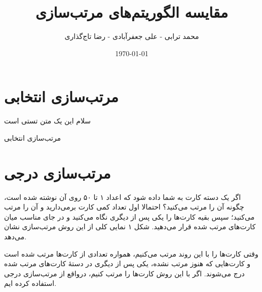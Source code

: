 \documentclass[12pt]{article}
\title{مقایسه الگوریتم‌های مرتب‌سازی}
\author{محمد ترابی - علی جعفر‌آبادی - رضا تاج‌گذاری}
\date{\today}
\makeatletter
\def\BState{\State\hskip-\ALG@thistlm}
\makeatother
\begin{document}
\maketitle

\section{مرتب‌سازی انتخابی}

سلام این یک متن تستی است


\begin{algorithm}
  \caption{مرتب‌سازی انتخابی}\label{euclid}
  \begin{latin}
  \end{latin}
\end{algorithm}

\section{مرتب‌سازی درجی}

اگر یک دسته کارت به شما داده شود که اعداد ۱ تا ۵۰ روی آن نوشته شده است، چگونه آن را مرتب می‌کنید؟
احتمالا اول تعداد کمی کارت برمی‌دارید و آن را مرتب می‌کنید؛
سپس بقیه کارت‌ها را یکی پس از دیگری نگاه می‌کنید
و در جای مناسب میان کارت‌های مرتب شده قرار می‌دهید.
شکل ۱ نمایی کلی از این روش مرتب‌سازی نشان می‌دهد.

وقتی کارت‌ها را با این روند مرتب می‌کنیم، همواره تعدادی از کارت‌ها مرتب شده است و کارت‌هایی که هنوز مرتب نشده، یکی پس از دیگری
در دستهٔ کارت‌های مرتب شده درج می‌شوند.
اگر با این روش کارت‌ها را مرتب کنیم، درواقع از مرتب‌سازی درجی استفاده کرده ایم.
\end{document}
